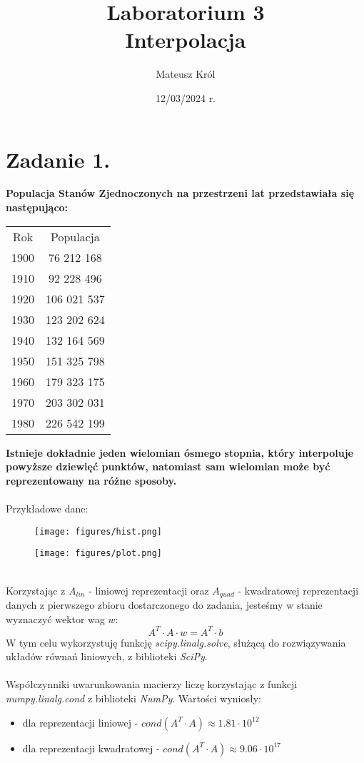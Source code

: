 \documentclass{article}
\title{%
Laboratorium 3\\
  \huge Interpolacja}
\author{Mateusz Król}
\date{12/03/2024 r.}
\begin{document}
\maketitle


\section*{Zadanie 1.}
\textbf{Populacja Stanów Zjednoczonych na przestrzeni lat przedstawiała
się następująco:}
\begin{center}
  \begin{tabular}{c c} 
   Rok & Populacja\\
   1900 & 76 212 168\\
   1910 & 92 228 496\\
   1920 & 106 021 537\\
   1930 & 123 202 624\\
   1940 & 132 164 569\\
   1950 & 151 325 798\\
   1960 & 179 323 175\\
   1970 & 203 302 031\\
   1980 &226 542 199
  \end{tabular}
\end{center}
\textbf{Istnieje dokładnie jeden wielomian ósmego stopnia, który interpoluje
 powyższe dziewięć punktów, natomiast sam wielomian może być reprezentowany na różne sposoby.}
\\\\
Przykładowe dane:
\begin{figure}[ht!]
  \texttt{[image: figures/hist.png]}
\end{figure}
\begin{figure}[ht!]
  \texttt{[image: figures/plot.png]}
\end{figure}
\\
Korzystając z $A_{lin}$ - liniowej reprezentacji oraz $A_{quad}$ - 
kwadratowej reprezentacji danych z pierwszego zbioru dostarczonego do zadania, jesteśmy w 
stanie wyznaczyć wektor wag $w$:
$$ A^T \cdot A \cdot w = A^T \cdot b$$
W tym celu wykorzystuję funkcję \textit{scipy.linalg.solve}, służącą do rozwiązywania 
układów równań liniowych, z biblioteki \textit{SciPy}. \\\\
Współczynniki uwarunkowania macierzy liczę korzystając z funkcji \textit{numpy.linalg.cond} 
z biblioteki \textit{NumPy}.
Wartości wyniosły:
\begin{itemize}
  \item dla reprezentacji liniowej - $cond(A^T\cdot A)\approx 1.81\cdot 10^{12}$
  \item dla reprezentacji kwadratowej - $cond(A^T\cdot A)\approx 9.06\cdot 10^{17}$
\end{itemize}
\end{document}
